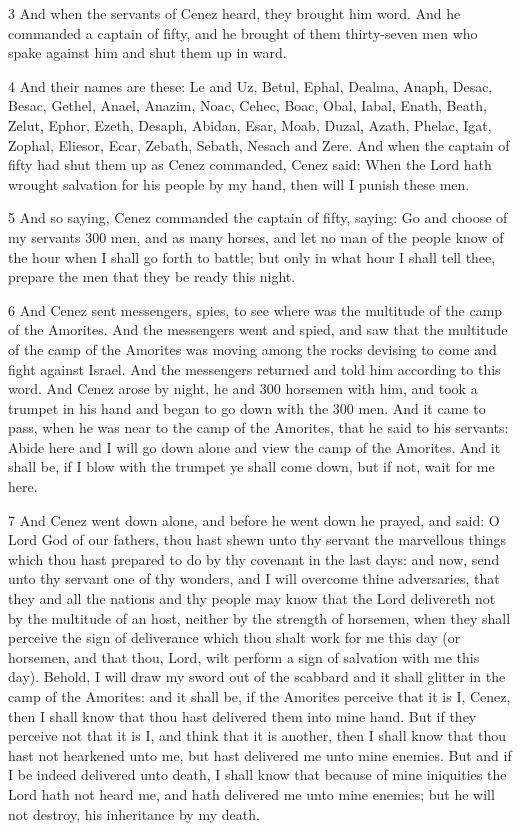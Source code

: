 \par 3 And when the servants of Cenez heard, they brought him word. And he commanded a captain of fifty, and he brought of them thirty-seven men who spake against him and shut them up in ward. 

\par 4 And their names are these: Le and Uz, Betul, Ephal, Dealma, Anaph, Desac, Besac, Gethel, Anael, Anazim, Noac, Cehec, Boac, Obal, Iabal, Enath, Beath, Zelut, Ephor, Ezeth, Desaph, Abidan, Esar, Moab, Duzal, Azath, Phelac, Igat, Zophal, Eliesor, Ecar, Zebath, Sebath, Nesach and Zere. And when the captain of fifty had shut them up as Cenez commanded, Cenez said: When the Lord hath wrought salvation for his people by my hand, then will I punish these men. 

\par 5 And so saying, Cenez commanded the captain of fifty, saying: Go and choose of my servants 300 men, and as many horses, and let no man of the people know of the hour when I shall go forth to battle; but only in what hour I shall tell thee, prepare the men that they be ready this night. 

\par 6 And Cenez sent messengers, spies, to see where was the multitude of the camp of the Amorites. And the messengers went and spied, and saw that the multitude of the camp of the Amorites was moving among the rocks devising to come and fight against Israel. And the messengers returned and told him according to this word. And Cenez arose by night, he and 300 horsemen with him, and took a trumpet in his hand and began to go down with the 300 men. And it came to pass, when he was near to the camp of the Amorites, that he said to his servants: Abide here and I will go down alone and view the camp of the Amorites. And it shall be, if I blow with the trumpet ye shall come down, but if not, wait for me here.

\par 7 And Cenez went down alone, and before he went down he prayed, and said: O Lord God of our fathers, thou hast shewn unto thy servant the marvellous things which thou hast prepared to do by thy covenant in the last days: and now, send unto thy servant one of thy wonders, and I will overcome thine adversaries, that they and all the nations and thy people may know that the Lord delivereth not by the multitude of an host, neither by the strength of horsemen, when they shall perceive the sign of deliverance which thou shalt work for me this day (or horsemen, and that thou, Lord, wilt perform a sign of salvation with me this day). Behold, I will draw my sword out of the scabbard and it shall glitter in the camp of the Amorites: and it shall be, if the Amorites perceive that it is I, Cenez, then I shall know that thou hast delivered them into mine hand. But if they perceive not that it is I, and think that it is another, then I shall know that thou hast not hearkened unto me, but hast delivered me unto mine enemies. But and if I be indeed delivered unto death, I shall know that because of mine iniquities the Lord hath not heard me, and hath delivered me unto mine enemies; but he will not destroy, his inheritance by my death.

